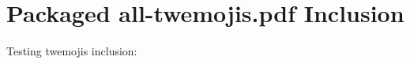 \documentclass{article}
\begin{document}
\section{Packaged all-twemojis.pdf Inclusion}

Testing twemojis inclusion:
 \quad {}
\end{document}
